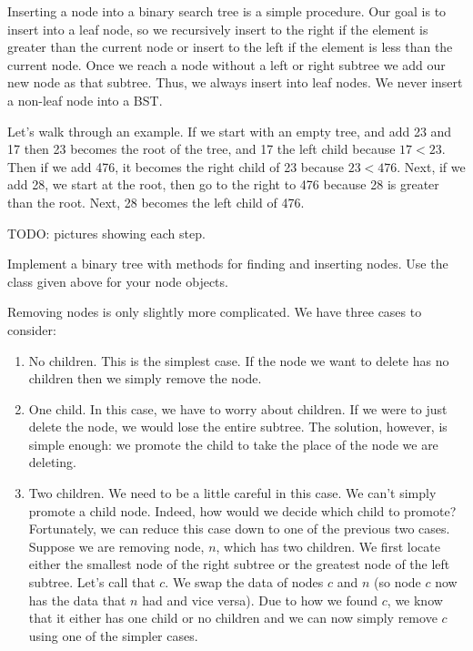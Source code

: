 Inserting a node into a binary search tree is a simple procedure.
Our goal is to insert into a leaf node, so
we recursively insert to the right if the element is greater than the current node
or insert to the left if the element is less than the current node.
Once we reach a node without a left or right subtree we add our new node as that subtree.
Thus, we always insert into leaf nodes.
We never insert a non-leaf node into a BST.

Let's walk through an example.
If we start with an empty tree, and add 23 and 17 then
23 becomes the root of the tree, and 17 the left child because $17 < 23$.
Then if we add 476, it becomes the right child of 23 because $23 < 476$.
Next, if we add 28, we start at the root, then go to the right to 476 because 28 is greater than the root.
Next, 28 becomes the left child of 476.

TODO: pictures showing each step.

\begin{problem}
Implement a binary tree with methods for finding and inserting nodes.
Use the  class given above for your node objects.
\label{prob:BST1}
\end{problem}

Removing nodes is only slightly more complicated.
We have three cases to consider:
\begin{enumerate} %
\item No children.  This is the simplest case.  If the node we want to delete has no children then we simply remove the node.
\item One child.  In this case, we have to worry about children.
If we were to just delete the node, we would lose the entire subtree.
The solution, however, is simple enough:
we promote the child to take the place of the node we are deleting.
\item Two children.  We need to be a little careful in this case.
We can't simply promote a child node.  Indeed, how would we decide which child to promote?
Fortunately, we can reduce this case down to one of the previous two cases.
Suppose we are removing node, $n$, which has two children.
We first locate either the smallest node of the right subtree or the greatest node of the left subtree.
Let's call that $c$.
We swap the data of nodes $c$ and $n$ (so node $c$ now has the data that $n$ had and vice versa).
Due to how we found $c$, we know that it either has one child or no children and we can now simply remove $c$ using one of the simpler cases.
\end{enumerate}

